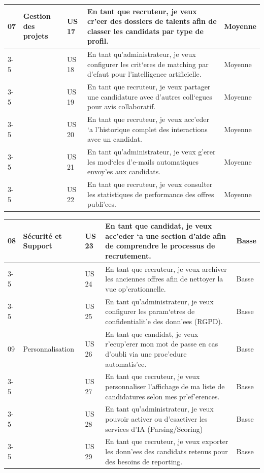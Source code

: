 \begin{table}[H]
\begin{tabular}{|p{1.2cm}|p{3cm}|p{1.2cm}|p{8cm}|p{1.8cm}|}
07 & Gestion des projets & US 17 & En tant que recruteur, je veux cr'eer des dossiers de talents afin de classer les candidats par type de profil. & Moyenne \\
\cline{3-5}
& & US 18 & En tant qu'administrateur, je veux configurer les crit`eres de matching par d'efaut pour l'intelligence artificielle. & Moyenne \\
\cline{3-5}
& & US 19 & En tant que recruteur, je veux partager une candidature avec d'autres coll`egues pour avis collaboratif. & Moyenne \\
\cline{3-5}
& & US 20 & En tant que recruteur, je veux acc'eder `a l'historique complet des interactions avec un candidat. & Moyenne \\
\cline{3-5}
& & US 21 & En tant qu'administrateur, je veux g'erer les mod`eles d'e-mails automatiques envoy'es aux candidats. & Moyenne \\
\cline{3-5}
& & US 22 & En tant que recruteur, je veux consulter les statistiques de performance des offres publi'ees. & Moyenne \\
\hline

\end{tabular}
\end{table}

\begin{table}[H]
\centering
\renewcommand{\arraystretch}{1.4}
\begin{tabular}{|p{1.2cm}|p{3cm}|p{1.2cm}|p{8cm}|p{1.8cm}|}
\hline

08 & Sécurité et Support & US 23 & En tant que candidat, je veux acc'eder `a une section d'aide afin de comprendre le processus de recrutement. & Basse \\
\cline{3-5}
& & US 24 & En tant que recruteur, je veux archiver les anciennes offres afin de nettoyer la vue op'erationnelle. & Basse \\
\cline{3-5}
& & US 25 &  En tant qu'administrateur, je veux configurer les param`etres de confidentialit'e des donn'ees (RGPD). & Basse \\
\hline

09 & Personnalisation  & US 26 & En tant que candidat, je veux r'ecup'erer mon mot de passe en cas d'oubli via une proc'edure automatis'ee. & Basse \\
\cline{3-5}
& & US 27 & En tant que recruteur, je veux personnaliser l'affichage de ma liste de candidatures selon mes pr'ef'erences. & Basse \\
\cline{3-5}
& & US 28 & En tant qu'administrateur, je veux pouvoir activer ou d'esactiver les services d'IA (Parsing/Scoring) & Basse \\
\cline{3-5}
& & US 29 & En tant que recruteur, je veux exporter les donn'ees des candidats retenus pour des besoins de reporting. & Basse \\
\hline

\end{tabular}
\end{table}


